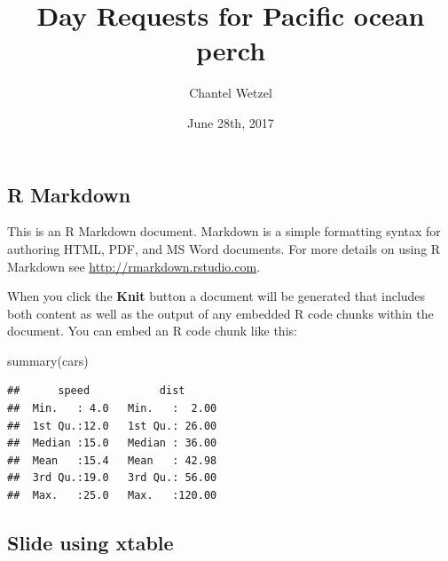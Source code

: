 \documentclass[10pt,]{article}
\title{Day Requests for Pacific ocean perch}
\author{Chantel Wetzel}
\date{June 28th, 2017}
\newenvironment{Shaded}{}{}
\newcommand{\KeywordTok}[1]{\textcolor[rgb]{0.00,0.00,1.00}{{#1}}}
\newcommand{\NormalTok}[1]{{#1}}
\begin{document}
\maketitle

\subsection{R Markdown}\label{r-markdown}

This is an R Markdown document. Markdown is a simple formatting syntax
for authoring HTML, PDF, and MS Word documents. For more details on
using R Markdown see \url{http://rmarkdown.rstudio.com}.

When you click the \textbf{Knit} button a document will be generated
that includes both content as well as the output of any embedded R code
chunks within the document. You can embed an R code chunk like this:

\begin{Shaded}
\begin{Highlighting}[]
\KeywordTok{summary}\NormalTok{(cars)}
\end{Highlighting}
\end{Shaded}

\begin{verbatim}
##      speed           dist       
##  Min.   : 4.0   Min.   :  2.00  
##  1st Qu.:12.0   1st Qu.: 26.00  
##  Median :15.0   Median : 36.00  
##  Mean   :15.4   Mean   : 42.98  
##  3rd Qu.:19.0   3rd Qu.: 56.00  
##  Max.   :25.0   Max.   :120.00
\end{verbatim}

\subsection{Slide using xtable}\label{slide-using-xtable}
\end{document}
